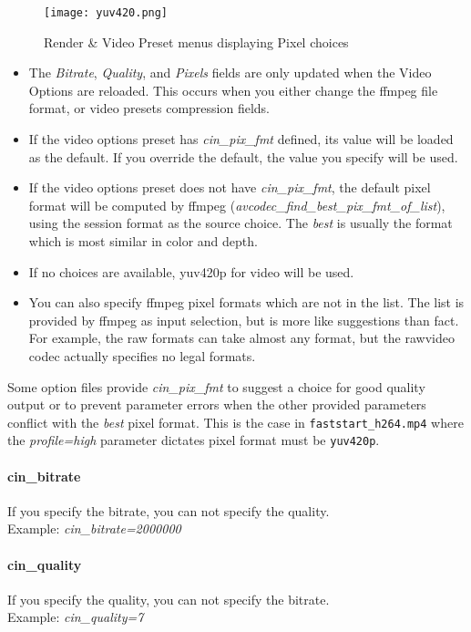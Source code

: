 \begin{figure}[htpb]
    \centering
    \texttt{[image: yuv420.png]}
    \caption{Render \& Video Preset menus displaying Pixel choices}
    \label{fig:yuv420}
\end{figure}

\begin{itemize}
    \item The \textit{Bitrate}, \textit{Quality}, and \textit{Pixels} fields are only updated when the Video Options are reloaded.  This
    occurs when you either change the ffmpeg file format, or video presets compression fields.
    \item If the video options preset has \textit{cin\_pix\_fmt} defined, its value will be loaded as the default.  If you
    override the default, the value you specify will be used.
    \item If the video options preset does not have \textit{cin\_pix\_fmt}, the default pixel format will be computed by ffmpeg (\textit{avcodec\_find\_best\_pix\_fmt\_of\_list}), using the session format as the source choice.  The
    \textit{best} is usually the format which is most similar in color and depth.
    \item If no choices are available, yuv420p for video will be used.
    \item You can also specify ffmpeg pixel formats which are not in the list.  The list is provided by ffmpeg as input selection, but is more like suggestions than fact.  For example, the raw formats can take almost any format, but the rawvideo codec actually specifies no legal formats.
\end{itemize}

\noindent Some option files provide \textit{cin\_pix\_fmt} to suggest a choice for good quality output or to prevent parameter errors when the other provided parameters conflict with the \textit{best} pixel format.  This is the case in \texttt{faststart\_h264.mp4} where the \textit{profile=high} parameter dictates pixel format must be \texttt{yuv420p}.

\paragraph{cin\_bitrate} If you specify the bitrate, you can not specify the quality.\\
Example: \textit{cin\_bitrate=2000000}

\paragraph{cin\_quality} If you specify the quality, you can not specify the bitrate.\\
Example: \textit{cin\_quality=7}

